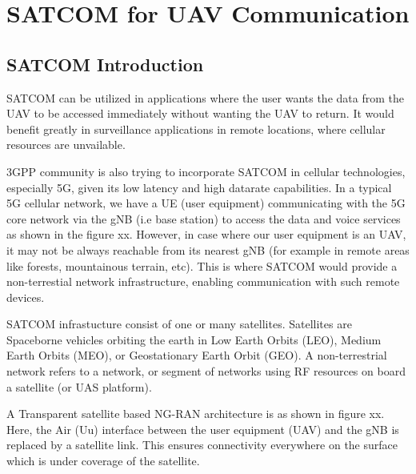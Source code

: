 \chapter{SATCOM for UAV Communication}
\section{SATCOM Introduction}
SATCOM can be utilized in applications where the user wants the data from the UAV to be accessed immediately without wanting the UAV to return. It would benefit greatly in surveillance applications in remote locations, where cellular resources are unvailable.

3GPP community is also trying to incorporate SATCOM in cellular technologies, especially 5G, given its low latency and high datarate capabilities. In a typical 5G cellular network, we have a UE (user equipment) communicating with the 5G core network via the gNB (i.e base station) to access the data and voice services as shown in the figure xx. However, in case where our user equipment is an UAV, it may not be always reachable from its nearest gNB (for example in remote areas like forests, mountainous terrain, etc). This is where SATCOM would provide a non-terrestial network infrastructure, enabling communication with such remote devices.

SATCOM infrastucture consist of one or many satellites. Satellites are Spaceborne vehicles orbiting the earth in Low Earth Orbits (LEO), Medium Earth Orbits (MEO), or Geostationary Earth Orbit (GEO). A non-terrestrial network refers to a network, or segment of networks using RF resources on board a satellite (or UAS platform).

A Transparent satellite based NG-RAN architecture is as shown in figure xx. Here, the Air (Uu) interface between the user equipment (UAV) and the gNB is replaced by a satellite link. This ensures connectivity everywhere on the surface which is under coverage of the satellite.

